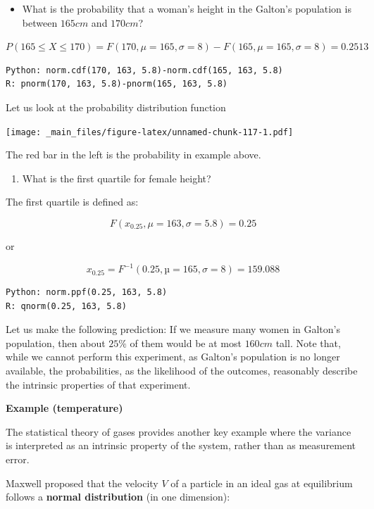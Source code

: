 \documentclass[
]{book}
\providecommand{\tightlist}{%
  \setlength{\itemsep}{0pt}\setlength{\parskip}{0pt}}
\begin{document}
\begin{itemize}
\tightlist
\item
  What is the probability that a woman's height in the Galton's population is between \(165cm\) and \(170cm\)?
\end{itemize}

\(P(165 \le X \le 170)=F(170, \mu=165, \sigma=8)-F(165, \mu=165, \sigma=8)=0.2513\)

\begin{verbatim}
Python: norm.cdf(170, 163, 5.8)-norm.cdf(165, 163, 5.8)
R: pnorm(170, 163, 5.8)-pnorm(165, 163, 5.8)
\end{verbatim}

Let us look at the probability distribution function

\texttt{[image: \_main\_files/figure-latex/unnamed-chunk-117-1.pdf]}

The red bar in the left is the probability in example above.

\begin{enumerate}
\def\labelenumi{\arabic{enumi})}
\setcounter{enumi}{2}
\tightlist
\item
  What is the first quartile for female height?
\end{enumerate}

The first quartile is defined as:

\[F(x_{0.25}, \mu=163, \sigma=5.8)=0.25\]

or

\[x_{0.25}=F^{-1}(0.25, µ=165, \sigma=8)=159.088\]

\begin{verbatim}
Python: norm.ppf(0.25, 163, 5.8)
R: qnorm(0.25, 163, 5.8)
\end{verbatim}

Let us make the following prediction: If we measure many women in Galton's population, then about \(25\%\) of them would be at most \(160cm\) tall. Note that, while we cannot perform this experiment, as Galton's population is no longer available, the probabilities, as the likelihood of the outcomes, reasonably describe the intrinsic properties of that experiment.

\textbf{Example (temperature)}

The statistical theory of gases provides another key example where the variance is interpreted as an intrinsic property of the system, rather than as measurement error.

Maxwell proposed that the velocity \(V\) of a particle in an ideal gas at equilibrium follows a \textbf{normal distribution} (in one dimension):
\end{document}
